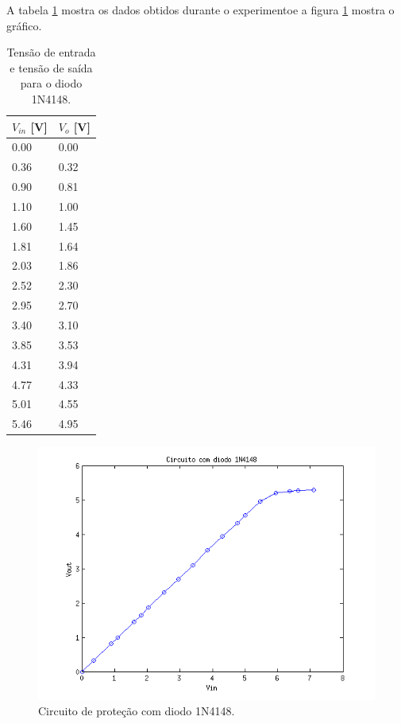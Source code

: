A tabela \ref{t_1n4148} mostra os dados obtidos durante o experimentoe a figura \ref{f_plot1n4148} mostra o gráfico.
\begin{small}
	\begin{table}[H]
		\begin{center}
			\caption{Tensão de entrada e tensão de saída para o diodo 1N4148.}
			\begin{tabular}{l|l}
				\hline
				$V_{in}$ [V] & $V_o$ [V] \\
				\hline
				0.00 & 0.00 \\
				\hline
				0.36 & 0.32 \\
				\hline
				0.90 & 0.81 \\
				\hline
				1.10 & 1.00 \\
				\hline
				1.60 & 1.45 \\
				\hline
				1.81 & 1.64 \\
				\hline
				2.03 & 1.86 \\
				\hline
				2.52 & 2.30 \\
				\hline
				2.95 & 2.70 \\
				\hline
				3.40 & 3.10 \\
				\hline
				3.85 & 3.53 \\
				\hline
				4.31 & 3.94 \\
				\hline
				4.77 & 4.33 \\
				\hline
				5.01 & 4.55 \\
				\hline
				5.46 & 4.95 \\
				\hline
			\end{tabular}
			\label{t_1n4148}
		\end{center}
	\end{table}
\end{small}

\begin{figure}[H]
	\centering
	\includegraphics[scale=1]{img/plot1n4147.png}
	\caption{Circuito de proteção com diodo 1N4148.}
	\label{f_plot1n4148}
\end{figure}


